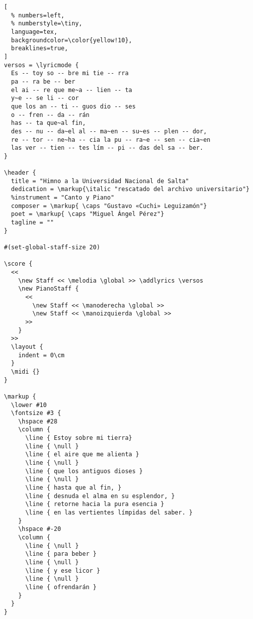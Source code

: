 \begin{lstlisting}[
  % numbers=left,
  % numberstyle=\tiny,
  language=tex,
  backgroundcolor=\color{yellow!10},
  breaklines=true,
]
versos = \lyricmode {
  Es -- toy so -- bre mi tie -- rra
  pa -- ra be -- ber
  el ai -- re que me~a -- lien -- ta
  y~e -- se li -- cor
  que los an -- ti -- guos dio -- ses
  o -- fren -- da -- rán
  has -- ta que~al fin,
  des -- nu -- da~el al -- ma~en -- su~es -- plen -- dor,
  re -- tor -- ne~ha -- cia la pu -- ra~e -- sen -- cia~en
  las ver -- tien -- tes lím -- pi -- das del sa -- ber.
}

\header {
  title = "Himno a la Universidad Nacional de Salta"
  dedication = \markup{\italic "rescatado del archivo universitario"}
  %instrument = "Canto y Piano"
  composer = \markup{ \caps "Gustavo «Cuchi» Leguizamón"}
  poet = \markup{ \caps "Miguel Ángel Pérez"}
  tagline = ""
}

#(set-global-staff-size 20)

\score {
  <<
    \new Staff << \melodia \global >> \addlyrics \versos
    \new PianoStaff {
      <<
        \new Staff << \manoderecha \global >>
        \new Staff << \manoizquierda \global >>
      >>
    }
  >>
  \layout {
    indent = 0\cm
  }
  \midi {}
}

\markup {
  \lower #10
  \fontsize #3 {
    \hspace #28
    \column {
      \line { Estoy sobre mi tierra}
      \line { \null }
      \line { el aire que me alienta }
      \line { \null }
      \line { que los antiguos dioses }
      \line { \null }
      \line { hasta que al fin, }
      \line { desnuda el alma en su esplendor, }
      \line { retorne hacia la pura esencia }
      \line { en las vertientes límpidas del saber. }
    }
    \hspace #-20
    \column {
      \line { \null }
      \line { para beber }
      \line { \null }
      \line { y ese licor }
      \line { \null }
      \line { ofrendarán }
    }
  }
}
\end{lstlisting}
